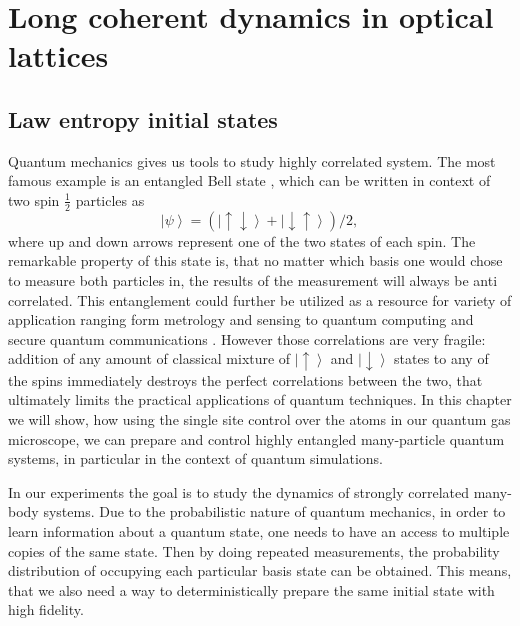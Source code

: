\chapter{Long coherent dynamics in optical lattices}

\section{Law entropy initial states}
Quantum mechanics gives us tools to study highly correlated system. The most famous example is an entangled Bell state \cite{something}, which can be written in context of two spin $\frac{1}{2}$ particles as 
\begin{equation}
\left| \psi \right>=(\left| \uparrow \downarrow \right>+ \left| \downarrow \uparrow \right>)/2,
\end{equation}
where up and down arrows represent one of the two states of each spin. The remarkable property of this state is, that no matter which basis one would chose to measure both particles in, the results of the measurement will always be anti correlated. This entanglement could further be utilized as a resource for variety of application ranging form metrology and sensing \cite{sombody} to quantum computing \cite{Chuang book} and secure quantum communications \cite{something}. However those correlations are very fragile: addition of any amount of classical mixture of $\left| \uparrow \right>$ and $\left| \downarrow \right>$ states to any of the spins immediately destroys the perfect correlations between the two, that ultimately limits the practical applications of quantum techniques. In this chapter we will show, how using the single site control over the atoms in our quantum gas microscope, we can prepare and control highly entangled many-particle quantum systems, in particular in the context of quantum simulations. 

In our experiments the goal is to study the dynamics of strongly correlated many-body systems. Due to the probabilistic nature of quantum mechanics, in order to learn information about a quantum state, one needs to have an access to multiple copies of the same state. Then by doing repeated measurements, the probability distribution of occupying each particular basis state can be obtained. This means, that we also need a way to deterministically prepare the same initial state with high fidelity. 

